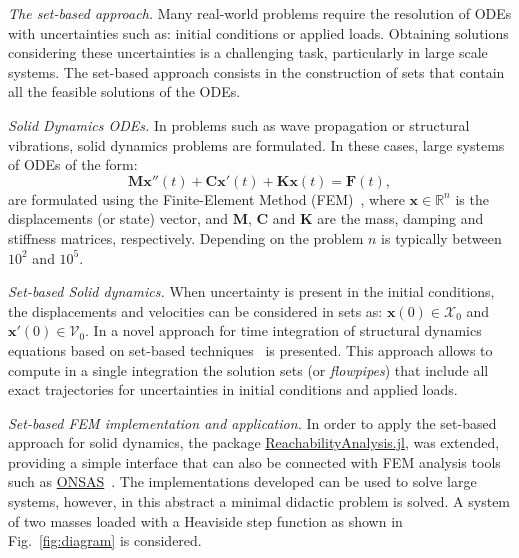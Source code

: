 \documentclass{juliacon}
\begin{document}
	


\maketitle

\emph{The set-based approach.} %
%
Many real-world problems require the resolution of ODEs with uncertainties such as: initial conditions or applied loads. %
%
Obtaining solutions considering these uncertainties is a challenging task, particularly in large scale systems.
%
The set-based approach consists in the construction of sets that contain all the feasible solutions of the ODEs. %


\vspace{0.2cm}

\emph{Solid Dynamics ODEs.} %
%
In problems such as wave propagation or structural vibrations, solid dynamics problems are formulated. %
%
In these cases, large systems of ODEs of the form:
%
\begin{equation}\label{eq:second_order}
\mathbf{M} \mathbf{x}''(t) + \mathbf{C}\mathbf{x}'(t) + \mathbf{K}\mathbf{x}(t) = \mathbf{F}(t),
\end{equation}
%
are formulated using the Finite-Element Method (FEM)~\cite{Bathe2014}, where $\mathbf{x} \in \mathbb{R}^n$ is the displacements (or state) vector, and $\mathbf{M}$, $\mathbf{C}$ and $\mathbf{K}$ are the mass, damping and stiffness matrices, respectively. Depending on the problem $n$ is typically  between $10^2$ and $10^5$.

	
\vspace{0.2cm}

\emph{Set-based Solid dynamics.} %
%
When uncertainty is present in the initial conditions, the displacements and velocities can be considered in sets as: $\mathbf{x}(0) \in \mathcal{X}_0$ and $\mathbf{x}'(0) \in \mathcal{V}_0$. %
%
In \cite{forets2021combining} a novel approach for time integration of structural dynamics equations based on set-based techniques~\cite{althoff2020set} is presented. %
%
This approach allows to compute in a single integration the solution sets (or \emph{flowpipes}) that include all exact trajectories for uncertainties in initial conditions and applied loads. %
%


\vspace{0.2cm}


\emph{Set-based FEM implementation and application.} %
%
In order to apply the set-based approach for solid dynamics, the package \href{http://github.com/JuliaReach/ReachabilityAnalysis.jl}{ReachabilityAnalysis.jl}, was extended, providing a simple interface that can also be connected with FEM analysis tools such as \href{http://onsas.org}{ONSAS}~\cite{onsas}.
%
The implementations developed can be used to solve large systems, however, in this abstract a minimal didactic problem is solved. %
%
A system of two masses loaded with a Heaviside step function as shown in Fig.~\ref{fig:diagram} is considered.
%
\end{document}

